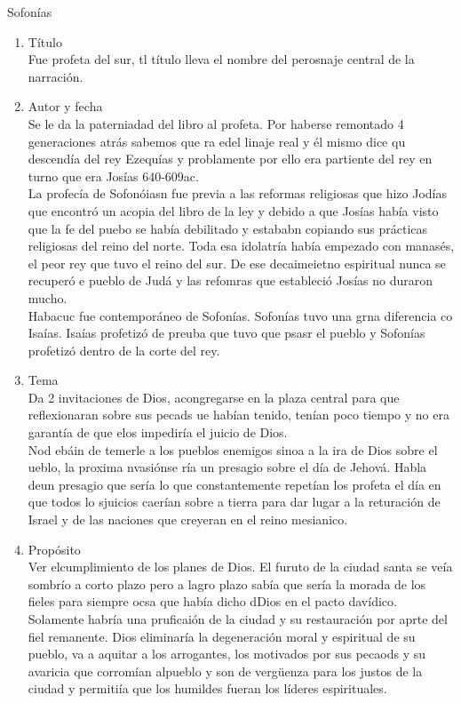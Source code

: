\documentclass[12pt]{article}
\begin{document}
\begin{section}{Sofonías}
	\begin{enumerate}
		\item Título\\
			Fue profeta del sur, tl título lleva el nombre del perosnaje central de la narración.
		\item Autor y fecha\\
			Se le da la paterniadad del libro al profeta. Por haberse remontado 4 generaciones atrás sabemos que ra edel linaje real y él mismo dice qu descendía del rey Ezequías y problamente por ello era partiente del rey en turno que era Josías 640-609ac.\\
			La profecía de Sofonóiasn fue previa a las reformas religiosas que hizo Jodías que encontró un acopia del libro de la ley y debido a que Josías había visto que la fe del puebo se había debilitado y estababn copiando sus prácticas religiosas del reino del norte. Toda esa idolatría había empezado con manasés, el peor rey que tuvo el reino del sur. De ese decaimeietno espiritual nunca se recuperó e pueblo de Judá y las refomras que estableció Josías no duraron mucho.\\
			Habacuc fue contemporáneo de Sofonías. Sofonías tuvo una grna diferencia co Isaías. Isaías profetizó de preuba que tuvo que psasr el pueblo y Sofonías profetizó dentro de la corte del rey.
		\item Tema\\
			Da 2 invitaciones de Dios, acongregarse en la plaza central para que reflexionaran sobre sus pecads ue habían tenido, tenían poco tiempo y no era garantía de que elos impediría el juicio de Dios.\\
			Nod ebáin de temerle a los pueblos enemigos sinoa a la ira de Dios sobre el ueblo, la proxima nvasiónse ría un presagio sobre el día de Jehová. Habla deun presagio que sería lo que constantemente repetían los profeta el día en que todos lo sjuicios caerían sobre a tierra para dar lugar a la returación de Israel y de las naciones que creyeran en el reino mesianico.
		\item Propósito\\
			Ver elcumplimiento de los planes de Dios. El furuto de la ciudad santa se veía sombrío a corto plazo pero a lagro plazo sabía que sería la morada de los fieles para siempre ocsa que había dicho dDios en el pacto davídico. Solamente habría una pruficaión de la ciudad y su restauración por aprte del fiel remanente. Dios eliminaría la degeneración moral y espiritual de su pueblo, va a aquitar a los arrogantes, los motivados por sus pecaods y su avaricia que corromían alpueblo y son de vergüenza para los justos de la ciudad y permitiía que los humildes fueran los líderes espirituales.\\

\end{enumerate}
\end{section}
\end{document}
